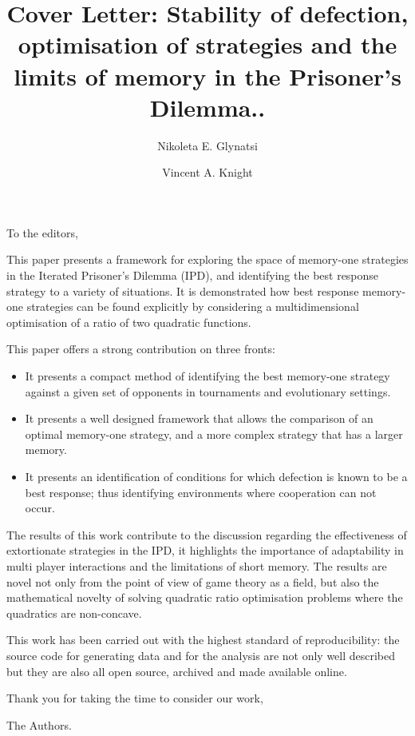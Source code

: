 \documentclass{article}
\title{Cover Letter: Stability of defection, optimisation of strategies and the
limits of memory in the Prisoner's Dilemma..}
\author[1]{Nikoleta E. Glynatsi}
\author[1]{Vincent A. Knight}
\affil[1]{Cardiff University, School of Mathematics, Cardiff, United Kingdom}
\date{}
\begin{document}
\maketitle

To the editors,

This paper presents a framework for exploring the space of memory-one strategies
in the Iterated Prisoner's Dilemma (IPD), and identifying the best response
strategy to a variety of situations. It is demonstrated how best response
memory-one strategies can be found explicitly by considering a multidimensional
optimisation of a ratio of two quadratic functions.

This paper offers a strong contribution on three fronts:

\begin{itemize}
    \item It presents a compact method of identifying the best memory-one
    strategy against a given set of opponents in tournaments and evolutionary
    settings.
    \item It presents a well designed framework that allows the comparison of an
          optimal memory-one strategy, and a more complex strategy that has a
          larger memory.
    \item It presents an identification of conditions for which defection is
          known to be a best response; thus identifying environments where
          cooperation can not occur.
\end{itemize}

The results of this work contribute to the discussion regarding the
effectiveness of extortionate strategies in the IPD, it highlights the importance
of adaptability in multi player interactions and the limitations of short memory.
The results are novel not only from the point of view of game theory as
a field, but also the mathematical novelty of solving quadratic ratio
optimisation problems where the quadratics are non-concave.

This work has been carried out with the highest standard of reproducibility: the
source code for generating data and for the analysis are not only well described
but they are also all open source, archived and made available online.

Thank you for taking the time to consider our work,

The Authors.
\end{document}
